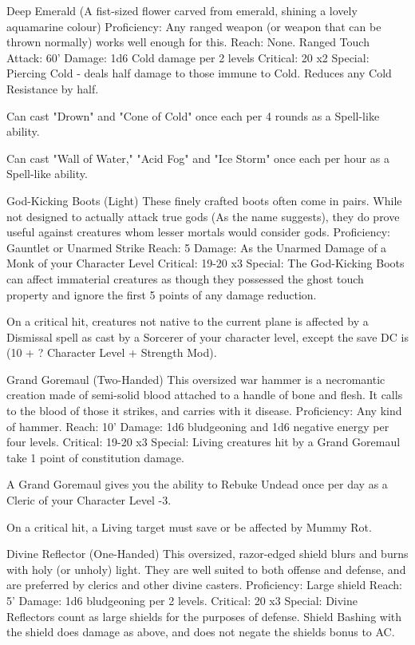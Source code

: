 Deep Emerald
(A fist-sized flower carved from emerald, shining a lovely aquamarine colour)
Proficiency: Any ranged weapon (or weapon that can be thrown normally) works well enough for this.
Reach: None.
Ranged Touch Attack: 60'
Damage: 1d6 Cold damage per 2 levels
Critical: 20 x2
Special:
Piercing Cold - deals half damage to those immune to Cold. Reduces any Cold Resistance by half.

Can cast "Drown" and "Cone of Cold" once each per 4 rounds as a Spell-like ability.

Can cast "Wall of Water," "Acid Fog" and "Ice Storm" once each per hour as a Spell-like ability.



God-Kicking Boots (Light)
These finely crafted boots often come in pairs. While not designed to actually attack true gods (As the name suggests), they do prove useful against creatures whom lesser mortals would consider gods.
Proficiency: Gauntlet or Unarmed Strike
Reach: 5
Damage: As the Unarmed Damage of a Monk of your Character Level
Critical: 19-20 x3
Special:
The God-Kicking Boots can affect immaterial creatures as though they possessed the ghost touch property and ignore the first 5 points of any damage reduction.

On a critical hit, creatures not native to the current plane is affected by a Dismissal spell as cast by a Sorcerer of your character level, except the save DC is (10 + ? Character Level + Strength Mod).


Grand Goremaul (Two-Handed)
This oversized war hammer is a necromantic creation made of semi-solid blood attached to a handle of bone and flesh. It calls to the blood of those it strikes, and carries with it disease.
Proficiency: Any kind of hammer.
Reach: 10'
Damage: 1d6 bludgeoning and 1d6 negative energy per four levels.
Critical: 19-20 x3
Special:
Living creatures hit by a Grand Goremaul take 1 point of constitution damage.

A Grand Goremaul gives you the ability to Rebuke Undead once per day as a Cleric of your Character Level -3.

On a critical hit, a Living target must save or be affected by Mummy Rot.


Divine Reflector (One-Handed)
This oversized, razor-edged shield blurs and burns with holy (or unholy) light. They are well suited to both offense and defense, and are preferred by clerics and other divine casters.
Proficiency: Large shield
Reach: 5'
Damage: 1d6 bludgeoning per 2 levels.
Critical: 20 x3
Special: Divine Reflectors count as large shields for the purposes of defense. Shield Bashing with the shield does damage as above, and does not negate the shields bonus to AC.

